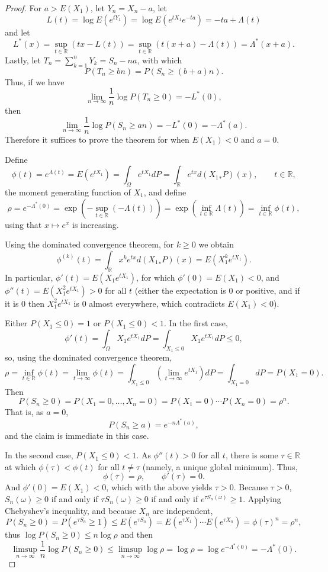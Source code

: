 \documentclass{article}
\theoremstyle{definition}
\begin{document}
\begin{proof}
For $a>E(X_1)$,
let $Y_n=X_n-a$, let
\[
L(t) = \log E(e^{tY_1}) = \log E(e^{tX_1}e^{-ta})=-ta+\Lambda(t)
\]
and let
\[
L^*(x) = \sup_{t \in \mathbb{R}} (tx-L(t)) = \sup_{t \in \mathbb{R}} (t(x+a)-\Lambda(t))
=\Lambda^*(x+a).
\]
Lastly, let $T_n=\sum_{k=1}^n Y_k=S_n - na$, with which
\[
P(T_n \geq bn) = P(S_n \geq (b+a)n).
\]
Thus, if we have
\[
\lim_{n \to \infty} \frac{1}{n} \log P(T_n \geq 0) = -L^*(0),
\]
then
\[
\lim_{n \to \infty} \frac{1}{n} \log P(S_n \geq an)=-L^*(0)
=-\Lambda^*(a).
\]
Therefore it suffices to prove the theorem for when $E(X_1)<0$ and
$a=0$. 



Define
\[
\phi(t) = e^{\Lambda(t)}=E(e^{tX_1}) = \int_\Omega e^{tX_1} dP = \int_\mathbb{R} e^{tx} d({X_1}_*P)(x), \qquad t \in \mathbb{R},
\]
the moment generating function of $X_1$,
and define 
\[
\rho = e^{-\Lambda^*(0)} = \exp\left( -\sup_{t \in \mathbb{R}}(-\Lambda(t))\right)
=\exp\left(\inf_{t \in \mathbb{R}} \Lambda(t) \right)
=\inf_{t \in \mathbb{R}} \phi(t),
\]
using that $x \mapsto e^x$ is increasing. 


Using the dominated convergence theorem, for $k \geq 0$ we obtain
\[
\phi^{(k)}(t) = \int_\mathbb{R} x^k e^{tx} d({X_1}_*P)(x)
=E(X_1^k e^{tX_1}).
\]
In particular, $\phi'(t)=E(X_1e^{tX_1})$, for which
$\phi'(0)=E(X_1)<0$, and $\phi''(t) = E(X_1^2 e^{tX_1})>0$ for all $t$ (either the expectation is $0$ or positive, and if it is $0$ then
$X_1^2 e^{tX_1}$ is $0$ almost everywhere, which contradicts $E(X_1)<0$).

Either $P(X_1 \leq 0)=1$ or $P(X_1 \leq 0)<1$. In the first case,
\[
\phi'(t) = \int_\Omega X_1 e^{tX_1} dP
=\int_{X_1 \leq 0} X_1 e^{tX_1} dP
\leq 0,
\]
so, using the dominated convergence theorem,
\[
\rho = \inf_{t \in \mathbb{R}} \phi(t) = \lim_{t \to \infty} \phi(t) = 
\int_{X_1 \leq 0} \left( \lim_{t \to \infty} e^{tX_1}\right) dP
=\int_{X_1=0} dP=P(X_1=0).
\]
Then 
\[
P(S_n \geq 0) = P(X_1=0,\ldots,X_n=0) = P(X_1=0) \cdots P(X_n=0)
=\rho^n.
\]
That is, as $a=0$,
\[
P(S_n \geq a)   = e^{-n\Lambda^*(a)},
\]
and the claim is immediate in this case.

In the second case, $P(X_1 \leq 0)<1$.  As $\phi''(t)>0$ for all $t$, there is some $\tau \in \mathbb{R}$ at
which $\phi(\tau)<\phi(t)$ for all $t \neq \tau$ (namely, a unique global minimum). Thus,
\[
\phi(\tau) = \rho, \qquad \phi'(\tau)=0.
\]
And $\phi'(0)=E(X_1)<0$, which with the above yields $\tau>0$.  
Because $\tau>0$, $S_n(\omega) \geq 0$ if and only if
$\tau S_n(\omega) \geq 0$ if and only if $e^{\tau S_n(\omega)} \geq 1$.  Applying Chebyshev's inequality, and because $X_n$ are independent,
\[
P(S_n \geq 0) = P(e^{\tau S_n}\geq 1) \leq E(e^{\tau S_n}) = E(e^{\tau X_1}) \cdots E(e^{\tau X_n})
=\phi(\tau)^n = \rho^n,
\]
thus $\log P(S_n \geq 0) \leq n \log \rho$ and then 
\[
\limsup_{n \to \infty} \frac{1}{n} \log P(S_n \geq 0) \leq \limsup_{n \to \infty} \log \rho = \log \rho
=\log e^{-\Lambda^*(0)}=-\Lambda^*(0).
\]


\end{proof}
\end{document}

